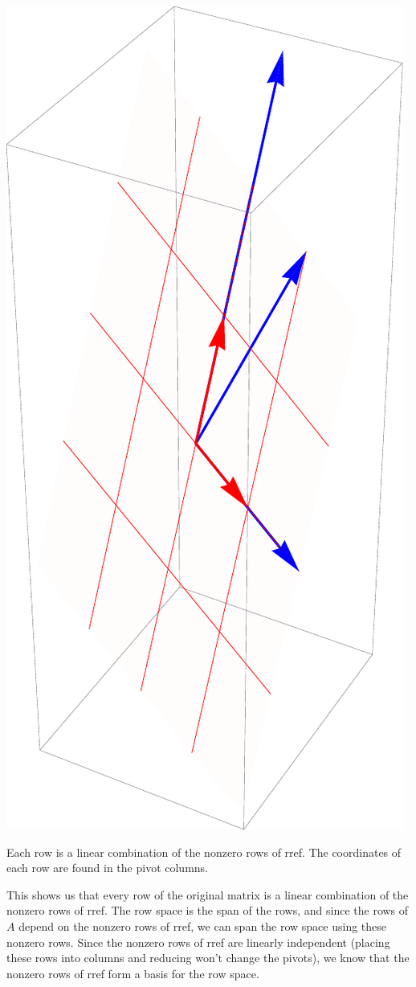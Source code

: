\begin{example}
{\includegraphics[width=\marginparwidth]{02-Applications/support/rowspace2}

Each row is a linear combination of the nonzero rows of rref.  The coordinates of each row are found in the pivot columns.
}
This shows us that every row of the original matrix is a linear combination of the nonzero rows of rref. The row space is the span of the rows, and since the rows of $A$ depend on the nonzero rows of rref, we can span the row space using these nonzero rows. Since the nonzero rows of rref are linearly independent (placing these rows into columns and reducing won't change the pivots), we know that the nonzero rows of rref form a basis for the row space.  
\end{example}



